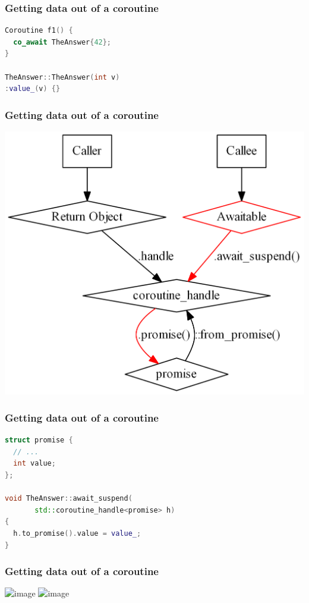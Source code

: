 \documentclass[aspectratio=169]{beamer}
\begin{document}
\begin{frame}[fragile]
  \frametitle{Getting data out of a coroutine}
  
  \begin{lstlisting}[language={C++}]
Coroutine f1() {
  co_await TheAnswer{42};
}

TheAnswer::TheAnswer(int v)
:value_(v) {}
  \end{lstlisting}
\end{frame}

\begin{frame}[fragile]
  \frametitle{Getting data out of a coroutine}

  \begin{center}
  \includegraphics[height=.9\textheight]{pipelinesgfx/path_out_020.png}
  \end{center}
\end{frame}

\begin{frame}[fragile]
  \frametitle{Getting data out of a coroutine}
  
  \begin{lstlisting}[language={C++}]
struct promise {
  // ...
  int value;
};

void TheAnswer::await_suspend(
       std::coroutine_handle<promise> h)
{
  h.to_promise().value = value_;
}
  \end{lstlisting}
\end{frame}

\begin{frame}[fragile]
  \frametitle{Getting data out of a coroutine}

  \begin{center}
  \includegraphics<1>[height=.9\textheight]{pipelinesgfx/path_out_030.png}
  \includegraphics<2>[height=.9\textheight]{pipelinesgfx/path_out_040.png}
  \end{center}
\end{frame}
\end{document}
